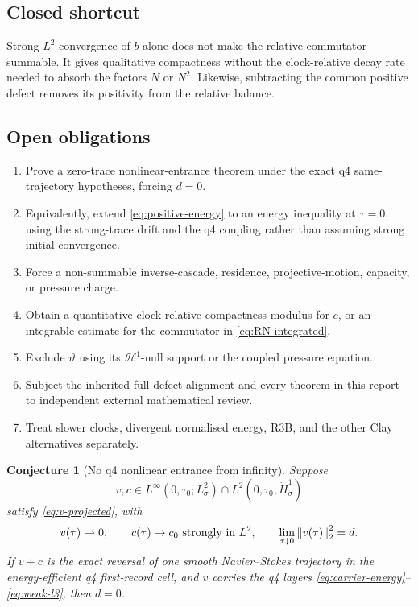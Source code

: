 \documentclass[11pt]{article}
\newtheorem{conjecture}[theorem]{Conjecture}
\theoremstyle{remark}
\newcommand{\norm}[1]{\left\|#1\right\|}
\newcommand{\weakto}{\rightharpoonup}
\begin{document}
\subsection*{Closed shortcut}

Strong \(L^2\) convergence of \(b\) alone does not make the relative
commutator summable.  It gives qualitative compactness without the
clock-relative decay rate needed to absorb the factors \(N\) or \(N^2\).
Likewise, subtracting the common positive defect removes its positivity
from the relative balance.

\subsection*{Open obligations}

\begin{enumerate}
 \item Prove a zero-trace nonlinear-entrance theorem under the exact q4
 same-trajectory hypotheses, forcing \(d=0\).
 \item Equivalently, extend \eqref{eq:positive-energy} to an energy
 inequality at \(\tau=0\), using the strong-trace drift and the q4
 coupling rather than assuming strong initial convergence.
 \item Force a non-summable inverse-cascade, residence,
 projective-motion, capacity, or pressure charge.
 \item Obtain a quantitative clock-relative compactness modulus for
 \(c\), or an integrable estimate for the commutator in
 \eqref{eq:RN-integrated}.
 \item Exclude \(\vartheta\) using its \(\mathcal H^1\)-null support or
 the coupled pressure equation.
 \item Subject the inherited full-defect alignment and every theorem in
 this report to independent external mathematical review.
 \item Treat slower clocks, divergent normalised energy, R3B, and the
 other Clay alternatives separately.
\end{enumerate}

\begin{conjecture}[No q4 nonlinear entrance from infinity]
\label{conj:no-entrance}
Suppose
\[
 v,c\in
 L^\infty(0,\tau_0;L^2_\sigma)
 \cap L^2(0,\tau_0;\dot H^1_\sigma)
\]
satisfy \eqref{eq:v-projected}, with
\[
 v(\tau)\weakto0,\qquad
 c(\tau)\to c_0\ \hbox{strongly in }L^2,\qquad
 \lim_{\tau\downarrow0}\norm{v(\tau)}_2^2=d.
\]
If \(v+c\) is the exact reversal of one smooth Navier--Stokes trajectory
in the energy-efficient q4 first-record cell, and \(v\) carries the q4
layers \eqref{eq:carrier-energy}--\eqref{eq:weak-l3}, then \(d=0\).
\end{conjecture}
\end{document}
